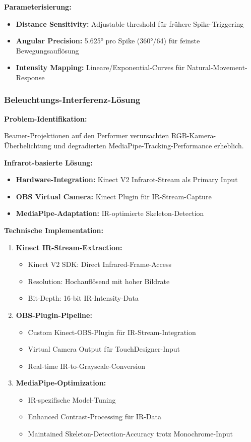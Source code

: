 \textbf{Parameterisierung:}
\begin{itemize}
    \item \textbf{Distance Sensitivity:} Adjustable threshold für frühere Spike-Triggering
    \item \textbf{Angular Precision:} 5.625° pro Spike (360°/64) für feinste Bewegungsauflösung
    \item \textbf{Intensity Mapping:} Lineare/Exponential-Curves für Natural-Movement-Response
\end{itemize}

\subsubsection{Beleuchtungs-Interferenz-Lösung}

\textbf{Problem-Identifikation:}
\raggedright Beamer-Projektionen auf den Performer verursachten RGB-Kamera-Überbelichtung und degradierten MediaPipe-Tracking-Performance erheblich.

\textbf{Infrarot-basierte Lösung:}
\begin{itemize}
    \item \textbf{Hardware-Integration:} Kinect V2 Infrarot-Stream als Primary Input
    \item \textbf{OBS Virtual Camera:} Kinect Plugin für IR-Stream-Capture
    \item \textbf{MediaPipe-Adaptation:} IR-optimierte Skeleton-Detection
\end{itemize}

\textbf{Technische Implementation:}
\begin{enumerate}
    \item \textbf{Kinect IR-Stream-Extraction:}
    \begin{itemize}
        \item Kinect V2 SDK: Direct Infrared-Frame-Access
        \item Resolution: Hochauflösend mit hoher Bildrate
        \item Bit-Depth: 16-bit IR-Intensity-Data
    \end{itemize}
    
    \item \textbf{OBS-Plugin-Pipeline:}
    \begin{itemize}
        \item Custom Kinect-OBS-Plugin für IR-Stream-Integration
        \item Virtual Camera Output für TouchDesigner-Input
        \item Real-time IR-to-Grayscale-Conversion
    \end{itemize}
    
    \item \textbf{MediaPipe-Optimization:}
    \begin{itemize}
        \item IR-spezifische Model-Tuning
        \item Enhanced Contrast-Processing für IR-Data
        \item Maintained Skeleton-Detection-Accuracy trotz Monochrome-Input
    \end{itemize}
\end{enumerate}

